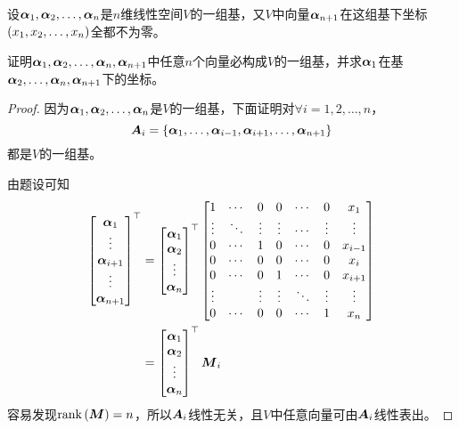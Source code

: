 \begin{problem}
设\({\boldsymbol{\alpha}}_1,{\boldsymbol{\alpha}}_2,\dots,{\boldsymbol{\alpha}}_{n}\)是\(n\)维线性空间\(V\)的一组基，又\(V\)中向量\(\boldsymbol{\alpha}_{n+1}\)在这组基下坐标\(\left( {x}_1,{x}_2,\dots,{x}_{n} \right)\)全都不为零。

证明\({\boldsymbol{\alpha}}_1,{\boldsymbol{\alpha}}_2,\dots,{\boldsymbol{\alpha}}_{n},\boldsymbol{\alpha}_{n+1}\)中任意\(n\)个向量必构成\(V\)的一组基，并求\(\boldsymbol{\alpha}_1\)在基\(\boldsymbol{\alpha}_2,\dots,\boldsymbol{\alpha}_n,\boldsymbol{\alpha}_{n+1}\)下的坐标。
\end{problem}
\begin{proof}
    因为\({\boldsymbol{\alpha}}_1,{\boldsymbol{\alpha}}_2,\dots,{\boldsymbol{\alpha}}_{n}\)是\(V\)的一组基，下面证明对\(\forall i=1,2,\dots,n\)，
    \begin{equation*}
        \boldsymbol{A}_i=\left\{\boldsymbol{\alpha}_1,\dots,\boldsymbol{\alpha}_{i-1},\boldsymbol{\alpha}_{i+1},\dots,\boldsymbol{\alpha}_{n+1} \right\}
    \end{equation*}
    都是\(V\)的一组基。

    由题设可知
    \begin{align*}
        \begin{bmatrix}\boldsymbol{\alpha}_1\\\vdots\\\boldsymbol{\alpha}_{i+1}\\\vdots\\\boldsymbol{\alpha}_{n+1}\end{bmatrix}^\top
         & =
        \begin{bmatrix}\boldsymbol{\alpha}_1\\\boldsymbol{\alpha}_2\\\vdots\\\boldsymbol{\alpha}_n\end{bmatrix}^\top
        \begin{bmatrix}
            1      & \cdots & 0      & 0      & \cdots & 0      & x_1     \\
            \vdots & \ddots & \vdots & \vdots & \cdots & \vdots & \vdots  \\
            0      & \cdots & 1      & 0      & \cdots & 0      & x_{i-1} \\
            0      & \cdots & 0      & 0      & \cdots & 0      & x_i     \\
            0      & \cdots & 0      & 1      & \cdots & 0      & x_{i+1} \\
            \vdots &        & \vdots & \vdots & \ddots & \vdots & \vdots  \\
            0      & \cdots & 0      & 0      & \cdots & 1      & x_n
        \end{bmatrix} \\
         & =
        \begin{bmatrix}\boldsymbol{\alpha}_1\\\boldsymbol{\alpha}_2\\\vdots\\\boldsymbol{\alpha}_n\end{bmatrix}^\top\boldsymbol{M}_i
    \end{align*}
    容易发现\(\mathrm{rank}\left( \boldsymbol{M} \right)=n\)，所以\(\boldsymbol{A}_i\)线性无关，且\(V\)中任意向量可由\(\boldsymbol{A}_i\)线性表出。


\end{proof}
